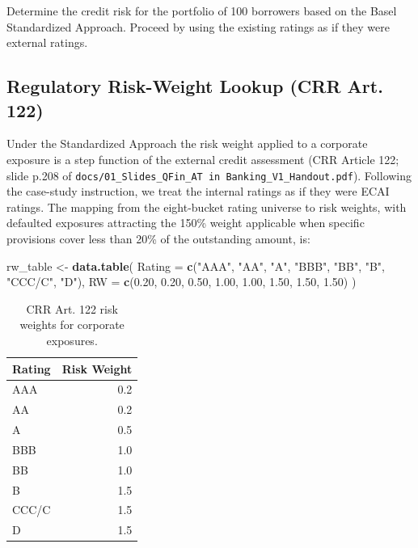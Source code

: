 \documentclass[
  11pt,
]{article}
\newenvironment{Shaded}{\begin{snugshade}}{\end{snugshade}}
\newcommand{\AttributeTok}[1]{\textcolor[rgb]{0.13,0.29,0.53}{#1}}
\newcommand{\FloatTok}[1]{\textcolor[rgb]{0.00,0.00,0.81}{#1}}
\newcommand{\FunctionTok}[1]{\textcolor[rgb]{0.13,0.29,0.53}{\textbf{#1}}}
\newcommand{\NormalTok}[1]{#1}
\newcommand{\OtherTok}[1]{\textcolor[rgb]{0.56,0.35,0.01}{#1}}
\newcommand{\StringTok}[1]{\textcolor[rgb]{0.31,0.60,0.02}{#1}}
\begin{document}
Determine the credit risk for the portfolio of 100 borrowers based on
the Basel Standardized Approach. Proceed by using the existing ratings
as if they were external ratings.

\subsection{Regulatory Risk-Weight Lookup (CRR Art.
122)}\label{regulatory-risk-weight-lookup-crr-art.-122}

Under the Standardized Approach the risk weight applied to a corporate
exposure is a step function of the external credit assessment (CRR
Article 122; slide p.208 of
\texttt{docs/01\_Slides\_QFin\_AT\ in\ Banking\_V1\_Handout.pdf}).
Following the case-study instruction, we treat the internal ratings as
if they were ECAI ratings. The mapping from the eight-bucket rating
universe to risk weights, with defaulted exposures attracting the 150\%
weight applicable when specific provisions cover less than 20\% of the
outstanding amount, is:

\begin{Shaded}
\begin{Highlighting}[]
\NormalTok{rw\_table }\OtherTok{\textless{}{-}} \FunctionTok{data.table}\NormalTok{(}
    \AttributeTok{Rating =} \FunctionTok{c}\NormalTok{(}\StringTok{"AAA"}\NormalTok{, }\StringTok{"AA"}\NormalTok{,  }\StringTok{"A"}\NormalTok{,  }\StringTok{"BBB"}\NormalTok{, }\StringTok{"BB"}\NormalTok{,  }\StringTok{"B"}\NormalTok{,  }\StringTok{"CCC/C"}\NormalTok{, }\StringTok{"D"}\NormalTok{),}
    \AttributeTok{RW     =} \FunctionTok{c}\NormalTok{(}\FloatTok{0.20}\NormalTok{,  }\FloatTok{0.20}\NormalTok{,  }\FloatTok{0.50}\NormalTok{, }\FloatTok{1.00}\NormalTok{,  }\FloatTok{1.00}\NormalTok{,  }\FloatTok{1.50}\NormalTok{, }\FloatTok{1.50}\NormalTok{,    }\FloatTok{1.50}\NormalTok{)}
\NormalTok{)}
\end{Highlighting}
\end{Shaded}

\begin{longtable}[t]{lr}
\caption{\label{tab:task2-rw-table-render}CRR Art. 122 risk weights for corporate exposures.}\\
\toprule
Rating & Risk Weight\\
\midrule
AAA & 0.2\\
AA & 0.2\\
A & 0.5\\
BBB & 1.0\\
BB & 1.0\\
\addlinespace
B & 1.5\\
CCC/C & 1.5\\
D & 1.5\\
\bottomrule
\end{longtable}
\end{document}
